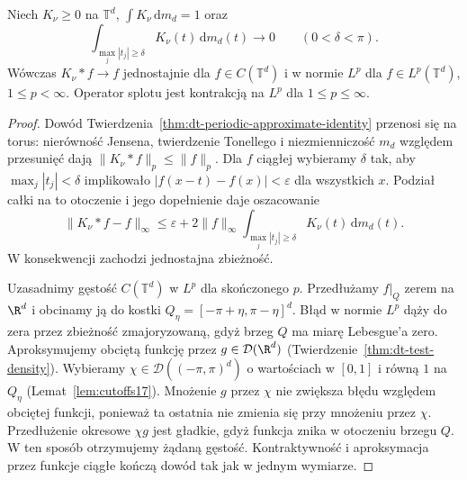 \begin{twierdzenie}
\label{thm:dt-torus-approximate-identity}
Niech $K_\nu\ge0$ na $\mathbb T^d$,
$\int K_\nu\,\mathrm dm_d=1$ oraz
\[
 \int_{\max_j|t_j|\ge\delta} K_\nu(t)\,\mathrm dm_d(t)
 \longrightarrow0
 \qquad(0<\delta<\pi).
\]
Wówczas $K_\nu*f\to f$ jednostajnie dla
$f\in C(\mathbb T^d)$ i w normie $L^p$ dla
$f\in L^p(\mathbb T^d)$, $1\le p<\infty$.
Operator splotu jest kontrakcją na $L^p$
dla $1\le p\le\infty$.
\end{twierdzenie}
\begin{proof}
Dowód Twierdzenia~\ref{thm:dt-periodic-approximate-identity}
przenosi się na torus: nierówność Jensena,
twierdzenie Tonellego i niezmienniczość $m_d$
względem przesunięć dają
$\|K_\nu*f\|_p\le\|f\|_p$.
Dla $f$ ciągłej wybieramy $\delta$ tak,
aby $\max_j|t_j|<\delta$ implikowało
$|f(x-t)-f(x)|<\varepsilon$ dla wszystkich $x$.
Podział całki na to otoczenie i jego dopełnienie
daje oszacowanie
\[
 \|K_\nu*f-f\|_\infty
 \le\varepsilon+2\|f\|_\infty
 \int_{\max_j|t_j|\ge\delta}K_\nu(t)\,\mathrm dm_d(t).
\]
W konsekwencji zachodzi jednostajna zbieżność.

Uzasadnimy gęstość $C(\mathbb T^d)$ w $L^p$
dla skończonego $p$. Przedłużamy $f|_Q$ zerem
na $\R^d$ i obcinamy ją do kostki
$Q_\eta=[-\pi+\eta,\pi-\eta]^d$.
Błąd w normie $L^p$ dąży do zera przez
zbieżność zmajoryzowaną, gdyż brzeg $Q$
ma miarę Lebesgue'a zero.
Aproksymujemy obciętą funkcję przez
$g\in\mathcal D(\R^d)$ (Twierdzenie~\ref{thm:dt-test-density}).
Wybieramy $\chi\in\mathcal D((-\pi,\pi)^d)$
o wartościach w $[0,1]$ i równą $1$ na $Q_\eta$
(Lemat~\ref{lem:cutoffs17}).
Mnożenie $g$ przez $\chi$ nie zwiększa błędu
względem obciętej funkcji, ponieważ ta ostatnia
nie zmienia się przy mnożeniu przez $\chi$.
Przedłużenie okresowe $\chi g$ jest gładkie,
gdyż funkcja znika w otoczeniu brzegu $Q$.
W ten sposób otrzymujemy żądaną gęstość.
Kontraktywność i aproksymacja przez funkcje ciągłe
kończą dowód tak jak w jednym wymiarze.
\end{proof}

